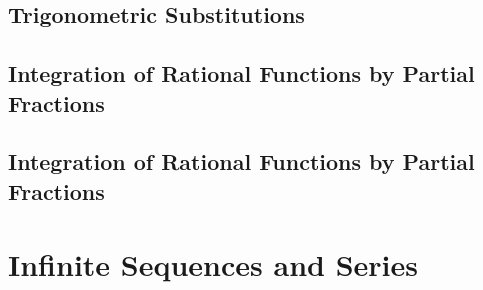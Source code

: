 \documentclass{report}
\begin{document}

\section{Trigonometric Substitutions}
\begin{quote}

\end{quote}


\section{Integration of Rational Functions by Partial Fractions}
\begin{quote}

\end{quote}


\setcounter{section}{7}
\section{Integration of Rational Functions by Partial Fractions}
\begin{quote}

\end{quote}


\setcounter{chapter}{9}
\chapter{Infinite Sequences and Series }

\end{document}

